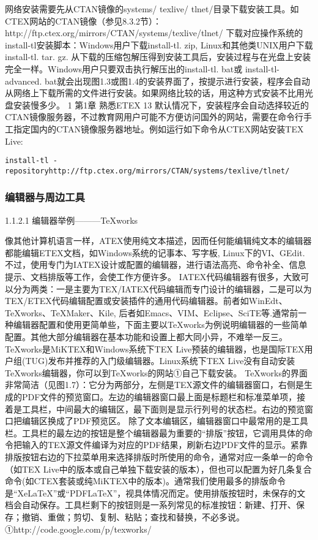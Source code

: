 \documentclass[UTF8]{ctexart}
\begin{document}
网络安装需要先从CTAN镜像的systems/ texlive/ tlnet/目录下载安装工具。如CTEX网站的CTAN镜像（参见8.3.2节）：
http://ftp.ctex.org/mirrors/CTAN/systems/texlive/tlnet/
下载对应操作系统的install-tl安装脚本：Windows用户下载install-tl. zip, Linux和其他类UNIX用户下载install-tl. tar. gz.
从下载的压缩包解压得到安装工具后，安装过程与在光盘上安装完全一样。Windows用户只要双击执行解压出的install-tl. bat或 install-tl-advanced. bat就会出现图1.3或图1.4的安装界面了，按提示进行安装，程序会自动从网络上下载所需的文件进行安装。如果网络比较的话，用这种方式安装不比用光盘安装慢多少。
1
第1章	熟悉ETEX	13
默认情况下，安装程序会自动选择较近的CTAN镜像服务器，不过教育网用户可能不方便访问国外的网站，需要在命令行手工指定国内的CTAN镜像服务器地址。例如运行如下命令从CTEX网站安装TEX Live:
\begin{verbatim}
install-tl -repositoryhttp://ftp.ctex.org/mirrors/CTAN/systems/texlive/tlnet/
\end{verbatim}

\subsubsection{编辑器与周边工具}
\label{subsub:编辑器与周边工具}


1.1.2.1 编辑器举例———TeXworks

像其他计算机语言一样，ATEX使用纯文本描述，因而任何能编辑纯文本的编辑器都能编辑ETEX文档，如Windows系统的记事本、写字板, Linux下的VI、GEdit.不过，使用专门为IATEX设计或配置的编辑器，进行语法高亮、命令补全、信息提示、文档排版等工作，会使工作方便许多。
IATEX代码编辑器有很多，大致可以分为两类：一是主要为TEX/IATEX代码编辑而专门设计的编辑器，二是可以为TEX/ETEX代码编辑配置或安装插件的通用代码编辑器。前者如WinEdt、TeXworks、TeXMaker、Kile, 后者如Emacs、VIM、Eclipse、SciTE等.通常前一种编辑器配置和使用更简单些，下面主要以TeXworks为例说明编辑器的一些简单配置。其他大部分编辑器在基本功能和设置上都大同小异，不难举一反三。
TeXworks是MiKTEX和Windows系统下TEX Live预装的编辑器，也是国际TEX用户组(TUG)发布并推荐的入门级编辑器。Linux系统下TEX Live没有自动安装TeXworks编辑器，你可以到TeXworks的网站①自己下载安装。
TeXworks的界面非常简洁（见图1.7）：它分为两部分，左侧是TEX源文件的编辑器窗口，右侧是生成的PDF文件的预览窗口。左边的编辑器窗口最上面是标题栏和标准菜单项，接着是工具栏，中间最大的编辑区，最下面则是显示行列号的状态栏。右边的预览窗口把编辑区换成了PDF预览区。
除了文本编辑区，编辑器窗口中最常用的是工具栏。工具栏的最左边的按钮是整个编辑器最为重要的“排版”按钮，它调用具体的命令把输入的TEX源文件编译为对应的PDF结果，刷新右边PDF文件的显示。紧靠排版按钮右边的下拉菜单用来选择排版时所使用的命令，通常对应一条单一的命令（如TEX Live中的版本或自己单独下载安装的版本），但也可以配置为好几条复合命令(如CTEX套装或纯MiKTEX中的版本)。通常我们使用最多的排版命令是“XeLaTeX”或“PDFLaTeX”，视具体情况而定。使用排版按钮时，未保存的文档会自动保存。工具栏剩下的按钮则是一系列常见的标准按钮：新建、打开、保存；撤销、重做；剪切、复制、粘贴；查找和替换，不必多说。
①http://code.google.com/p/texworks/
\end{document}
